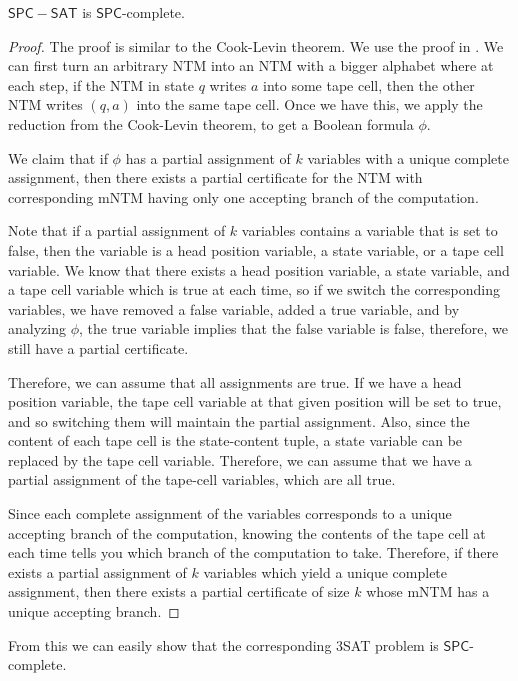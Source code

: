 \documentclass[runningheads,a4paper]{llncs}
\begin{document}
\begin{theorem}
$\mathsf{SPC-SAT}$ is $\mathsf{SPC}$-complete.
\end{theorem}

\begin{proof}
The proof is similar to the Cook-Levin theorem. We use the proof in \cite{Garey}. We can first turn an arbitrary NTM into an NTM with a bigger alphabet where at each step, if the NTM in state $q$ writes $a$ into some tape cell, then the other NTM writes $(q,a)$ into the same tape cell. Once we have this, we apply the reduction from the Cook-Levin theorem, to get a Boolean formula $\phi$. 

We claim that if $\phi$ has a partial assignment of $k$ variables with a unique complete assignment, then there exists a partial certificate for the NTM with corresponding mNTM having only one accepting branch of the computation.

Note that if a partial assignment of $k$ variables contains a variable that is set to false, then the variable is a head position variable, a state variable, or a tape cell variable. We know that there exists a head position variable, a state variable, and a tape cell variable which is true at each time, so if we switch the corresponding variables, we have removed a false variable, added a true variable, and by analyzing $\phi$, the true variable implies that the false variable is false, therefore, we still have a partial certificate. 

Therefore, we can assume that all assignments are true. If we have a head position variable, the tape cell variable at that given position will be set to true, and so switching them will maintain the partial assignment. Also, since the content of each tape cell is the state-content tuple, a state variable can be replaced by the tape cell variable. Therefore, we can assume that we have a partial assignment of the tape-cell variables, which are all true. 

Since each complete assignment of the variables corresponds to a unique accepting branch of the computation, knowing the contents of the tape cell at each time tells you which branch of the computation to take. Therefore, if there exists a partial assignment of $k$ variables which yield a unique complete assignment, then there exists a partial certificate of size $k$ whose mNTM has a unique accepting branch.
\end{proof}

From this we can easily show that the corresponding 3SAT problem is $\mathsf{SPC}$-complete.
\end{document}
